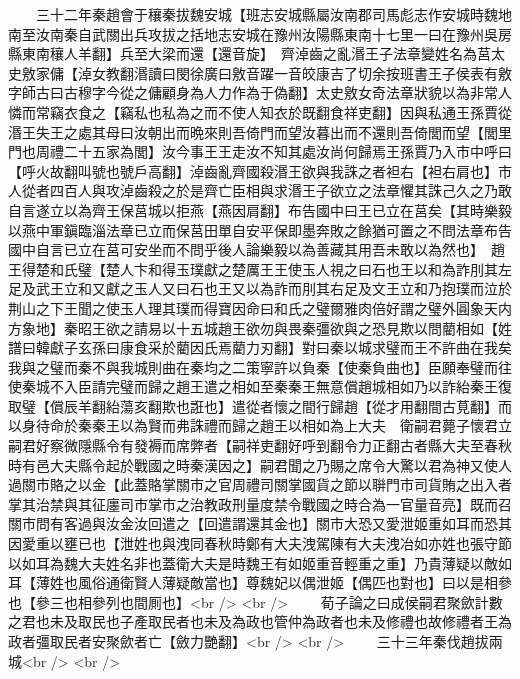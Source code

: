 　　三十二年秦趙會于穰秦拔魏安城【班志安城縣屬汝南郡司馬彪志作安城時魏地南至汝南秦自武關出兵攻拔之括地志安城在豫州汝陽縣東南十七里一曰在豫州吳房縣東南穰人羊翻】兵至大梁而還【還音旋】　齊淖齒之亂湣王子法章變姓名為莒太史敫家傭【淖女教翻湣讀曰閔徐廣曰敫音躍一音皎康吉了切余按班書王子侯表有敫字師古曰古穆字今從之傭顧身為人力作為于偽翻】太史敫女奇法章狀貌以為非常人憐而常竊衣食之【竊私也私為之而不使人知衣於既翻食祥吏翻】因與私通王孫賈從湣王失王之處其母曰汝朝出而晩來則吾倚門而望汝暮出而不還則吾倚閭而望【閭里門也周禮二十五家為閭】汝今事王王走汝不知其處汝尚何歸焉王孫賈乃入市中呼曰【呼火故翻叫號也號戶高翻】淖齒亂齊國殺湣王欲與我誅之者袒右【袒右肩也】市人從者四百人與攻淖齒殺之於是齊亡臣相與求湣王子欲立之法章懼其誅己久之乃敢自言遂立以為齊王保莒城以拒燕【燕因肩翻】布告國中曰王已立在莒矣【其時樂毅以燕中軍鎭臨淄法章已立而保莒田單自安平保即墨奔敗之餘猶可置之不問法章布告國中自言已立在莒可安坐而不問乎後人論樂毅以為善藏其用吾未敢以為然也】　趙王得楚和氏璧【楚人卞和得玉璞獻之楚厲王王使玉人視之曰石也王以和為詐刖其左足及武王立和又獻之玉人又曰石也王又以為詐而刖其右足及文王立和乃抱璞而泣於荆山之下王聞之使玉人理其璞而得寶因命曰和氏之璧爾雅肉倍好謂之璧外圓象天内方象地】秦昭王欲之請易以十五城趙王欲勿與畏秦彊欲與之恐見欺以問藺相如【姓譜曰韓獻子玄孫曰康食采於藺因氏焉藺力刃翻】對曰秦以城求璧而王不許曲在我矣我與之璧而秦不與我城則曲在秦均之二策寧許以負秦【使秦負曲也】臣願奉璧而往使秦城不入臣請完璧而歸之趙王遣之相如至秦秦王無意償趙城相如乃以詐紿秦王復取璧【償辰羊翻紿蕩亥翻欺也誑也】遣從者懷之間行歸趙【從才用翻間古莧翻】而以身待命於秦秦王以為賢而弗誅禮而歸之趙王以相如為上大夫　衛嗣君薨子懷君立嗣君好察微隱縣令有發褥而席弊者【嗣祥吏翻好呼到翻令力正翻古者縣大夫至春秋時有邑大夫縣令起於戰國之時秦漢因之】嗣君聞之乃賜之席令大驚以君為神又使人過關市賂之以金【此蓋賂掌關市之官周禮司關掌國貨之節以聨門市司貨賄之出入者掌其治禁與其征廛司市掌市之治教政刑量度禁令戰國之時合為一官量音亮】既而召關市問有客過與汝金汝回遣之【回遣謂還其金也】關市大恐又愛泄姬重如耳而恐其因愛重以壅已也【泄姓也與洩同春秋時鄭有大夫洩駕陳有大夫洩冶如亦姓也張守節以如耳為魏大夫姓名非也蓋衛大夫是時魏王有如姬重音輕重之重】乃貴薄疑以敵如耳【薄姓也風俗通衛賢人薄疑敵當也】尊魏妃以偶泄姬【偶匹也對也】曰以是相參也【參三也相參列也間厠也】<br />
<br />
　　荀子論之曰成侯嗣君聚歛計數之君也未及取民也子產取民者也未及為政也管仲為政者也未及修禮也故修禮者王為政者彊取民者安聚歛者亡【斂力艷翻】<br />
<br />
　　三十三年秦伐趙拔兩城<br />
<br />
